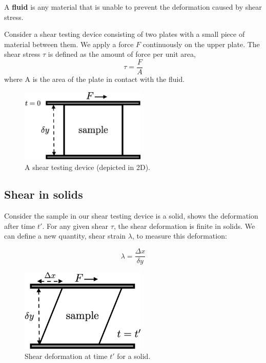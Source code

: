 \begin{definition}
  A \textbf{fluid} is any material that is unable to prevent the deformation caused by shear stress.
\end{definition}

Consider a shear testing device consisting of two plates with a small piece of material between them. We apply a force $F$ continuously on the upper plate. The shear stress $\tau$ is defined as the amount of force per unit area,
\begin{equation}
  \tau = \frac{F}{A}
\end{equation}
where A is the area of the plate in contact with the fluid.

\begin{figure}[h] \label{fig:shear-testing}
  \centering
  \includegraphics[width=6cm]{fig/shear-testing.png}
  \caption{A shear testing device (depicted in 2D).}
\end{figure}

\subsection{Shear in solids}

Consider the sample in our shear testing device is a solid,  shows the deformation after time $t'$. For any given shear $\tau$, the shear deformation is finite in solids. We can define a new quantity, shear strain $\lambda$, to measure this deformation:

\begin{equation}
  \lambda = \frac{ \Delta x }{ \delta y }
\end{equation}

\begin{figure} \label{fig:shear-solids}
  \centering
  \includegraphics[width=6cm]{fig/shear-solid.png}
  \caption{Shear deformation at time $t'$ for a solid.}
\end{figure}


